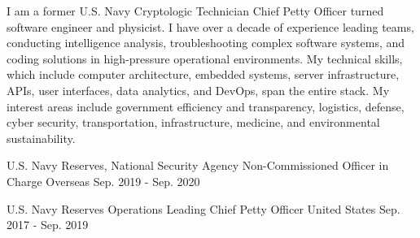 \documentclass[11pt, a4paper]{cv}
\begin{document}
\begin{header}
\address{Brooklyn, NY}
\mobile{}
\makeheader[C]
\end{header}
\medskip
\begin{cv}
\begin{summary}
\begin{cvparagraph}
I am a former U.S. Navy Cryptologic Technician Chief Petty Officer turned software engineer and physicist. I have over a decade of experience leading teams, conducting intelligence analysis, troubleshooting complex software systems, and coding solutions in high-pressure operational environments. My technical skills, which include computer architecture, embedded systems, server infrastructure, APIs, user interfaces, data analytics, and DevOps, span the entire stack. My interest areas include government efficiency and transparency, logistics, defense, cyber security, transportation, infrastructure, medicine, and environmental sustainability.
\end{cvparagraph}
\end{summary}
\begin{experience}
\begin{cventries}
\cventry
{U.S. Navy Reserves, National Security Agency}
{Non-Commissioned Officer in Charge}
{Overseas}
{Sep. 2019 - Sep. 2020}
{\begin{cvitems}
\end{cvitems}}
\cventry
{U.S. Navy Reserves}
{Operations Leading Chief Petty Officer}
{United States}
{Sep. 2017 - Sep. 2019}
{\begin{cvitems}

\end{cvitems}}
\end{cventries}
\end{experience}
\end{cv}
\end{document}
